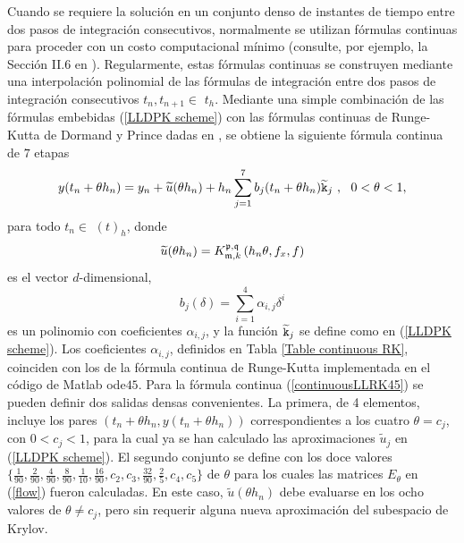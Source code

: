 Cuando se requiere la solución en un conjunto denso de instantes de tiempo entre dos pasos de integración consecutivos, normalmente se utilizan fórmulas continuas para proceder con un costo computacional mínimo (consulte, por ejemplo, la Sección II.6 en \cite{hairer1993solving}). Regularmente, estas fórmulas continuas se construyen mediante una interpolación polinomial de las fórmulas de integración entre dos pasos de integración consecutivos $t_{n},t_{n+1}\in $ $ t_{h}$. Mediante una simple combinación de las fórmulas embebidas (\ref{LLDPK scheme}) con las fórmulas continuas de Runge-Kutta de Dormand y Prince dadas en \cite{hairer1993solving}, se obtiene la siguiente fórmula continua de $7$ etapas
\begin{equation}
    y(t_{n}+\theta h_{n})=y_n+\widetilde{u}(\theta
    h_{n})+h_{n}\sum_{j=1}^{7}b_{j}(t_{n}+\theta h_{n})\widetilde{\mathtt{k}}_{j}\
    ,\ \ 0<\theta <1,  \label{continuousLLRK45}
\end{equation}%
 para todo $t_{n} \in $ $\left( t\right) _{h}$, donde
\begin{equation*}
    \widetilde{u}(\theta h_{n}) = K_{\mathfrak{m},k}^{\mathfrak{p},\mathfrak{q}}\left(h_n\theta, f_x , f \right)
\end{equation*}
    es el vector $d$-dimensional,
\begin{equation*}
    b_{j}(\delta )=\sum\limits_{i=1}^{4}\alpha _{i,j}\delta ^{i}
\end{equation*}
es un polinomio con coeficientes $\alpha _{i,j}$, y la función $\widetilde{\mathtt{k}}_{j}$ se define como en (\ref{LLDPK scheme}). Los coeficientes $\alpha _{i,j}$, definidos en
Tabla \ref{Table continuous RK}, coinciden con los de la
fórmula continua de Runge-Kutta implementada en el código de Matlab ode$45$. Para la fórmula continua (\ref{continuousLLRK45}) se pueden definir dos salidas densas convenientes. La primera, de 4 elementos, incluye los pares $(t_{n}+\theta h_{n},y(t_{n}+\theta h_{n}))$ correspondientes a los cuatro $\theta = c_j $, con $0<c_j<1$, para la cual ya se han calculado las aproximaciones $\widetilde{u}_j$ en (\ref{LLDPK scheme}). El segundo conjunto se define con los doce valores
$\{\frac{1}{90},\frac{2}{90},\frac{4}{90},\frac{8}{90},\frac{1}{10},\frac {16}{90},c_2,c_3,\frac{32}{90},\frac{2}{5},c_4,c_5\}$ de $\theta$ para los cuales las matrices $E_\theta$ en (\ref{flow}) fueron calculadas. En este caso, $\widetilde{u}(\theta h_{n})$ debe evaluarse en los ocho valores de $\theta \ne c_j$, pero sin requerir alguna nueva aproximación del subespacio de Krylov.

